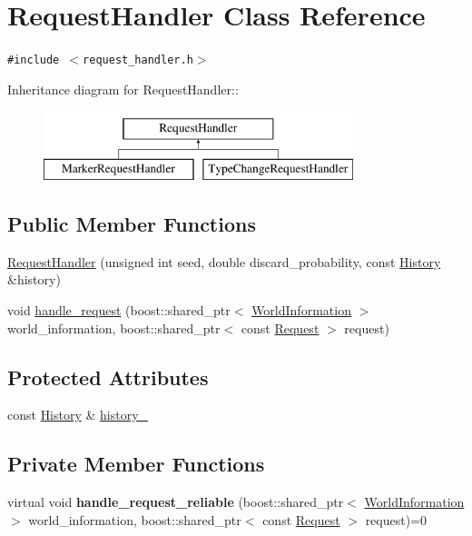 \hypertarget{class_request_handler}{
\section{RequestHandler Class Reference}
\label{class_request_handler}
}
{\tt \#include $<$request\_\-handler.h$>$}

Inheritance diagram for RequestHandler::\begin{figure}[H]
\begin{center}
\leavevmode
\includegraphics[height=2cm]{class_request_handler}
\end{center}
\end{figure}
\subsection*{Public Member Functions}
\begin{CompactItemize}
\item 
\hyperlink{class_request_handler_eb1589536489e52f0d6b0207f5d861d2}{RequestHandler} (unsigned int seed, double discard\_\-probability, const \hyperlink{class_history}{History} \&history)
\item 
void \hyperlink{class_request_handler_8f5f5cd120fdfa9774ea2e5f7886a908}{handle\_\-request} (boost::shared\_\-ptr$<$ \hyperlink{class_world_information}{WorldInformation} $>$ world\_\-information, boost::shared\_\-ptr$<$ const \hyperlink{class_request}{Request} $>$ request)
\end{CompactItemize}
\subsection*{Protected Attributes}
\begin{CompactItemize}
\item 
const \hyperlink{class_history}{History} \& \hyperlink{class_request_handler_a046537a35694efb8a288ed0b0283442}{history\_\-}
\end{CompactItemize}
\subsection*{Private Member Functions}
\begin{CompactItemize}
\item 
\hypertarget{class_request_handler_aee8881d705c6d20717e93d07a3929c4}{
virtual void \textbf{handle\_\-request\_\-reliable} (boost::shared\_\-ptr$<$ \hyperlink{class_world_information}{WorldInformation} $>$ world\_\-information, boost::shared\_\-ptr$<$ const \hyperlink{class_request}{Request} $>$ request)=0}
\label{class_request_handler_aee8881d705c6d20717e93d07a3929c4}

\end{CompactItemize}
